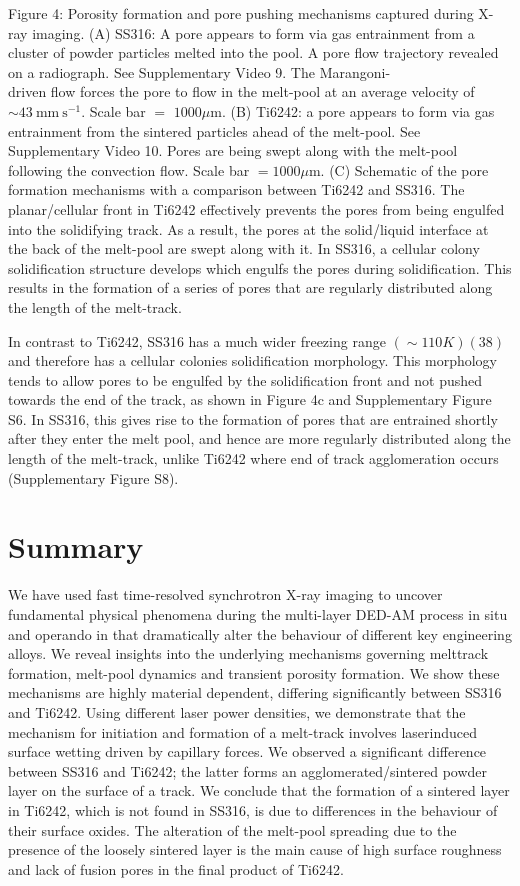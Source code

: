 \documentclass[10pt]{article}
\begin{document}
Figure 4: Porosity formation and pore pushing mechanisms captured during X-ray imaging. (A) SS316: A pore appears to form via gas entrainment from a cluster of powder particles melted into the pool. A pore flow trajectory revealed on a radiograph. See Supplementary Video 9. The Marangoni-\\
driven flow forces the pore to flow in the melt-pool at an average velocity of $\sim 43 \mathrm{~mm} \mathrm{~s}^{-1}$. Scale bar $=$ $1000 \mu \mathrm{m}$. (B) Ti6242: a pore appears to form via gas entrainment from the sintered particles ahead of the melt-pool. See Supplementary Video 10. Pores are being swept along with the melt-pool following the convection flow. Scale bar $=1000 \mu \mathrm{m}$. (C) Schematic of the pore formation mechanisms with a comparison between Ti6242 and SS316. The planar/cellular front in Ti6242 effectively prevents the pores from being engulfed into the solidifying track. As a result, the pores at the solid/liquid interface at the back of the melt-pool are swept along with it. In SS316, a cellular colony solidification structure develops which engulfs the pores during solidification. This results in the formation of a series of pores that are regularly distributed along the length of the melt-track.

In contrast to Ti6242, SS316 has a much wider freezing range $(\sim 110 K)(38)$ and therefore has a cellular colonies solidification morphology. This morphology tends to allow pores to be engulfed by the solidification front and not pushed towards the end of the track, as shown in Figure 4c and Supplementary Figure S6. In SS316, this gives rise to the formation of pores that are entrained shortly after they enter the melt pool, and hence are more regularly distributed along the length of the melt-track, unlike Ti6242 where end of track agglomeration occurs (Supplementary Figure S8).

\section*{Summary}
We have used fast time-resolved synchrotron X-ray imaging to uncover fundamental physical phenomena during the multi-layer DED-AM process in situ and operando in that dramatically alter the behaviour of different key engineering alloys. We reveal insights into the underlying mechanisms governing melttrack formation, melt-pool dynamics and transient porosity formation. We show these mechanisms are highly material dependent, differing significantly between SS316 and Ti6242. Using different laser power densities, we demonstrate that the mechanism for initiation and formation of a melt-track involves laserinduced surface wetting driven by capillary forces. We observed a significant difference between SS316 and Ti6242; the latter forms an agglomerated/sintered powder layer on the surface of a track. We conclude that the formation of a sintered layer in Ti6242, which is not found in SS316, is due to differences in the behaviour of their surface oxides. The alteration of the melt-pool spreading due to the presence of the loosely sintered layer is the main cause of high surface roughness and lack of fusion pores in the final product of Ti6242.
\end{document}
